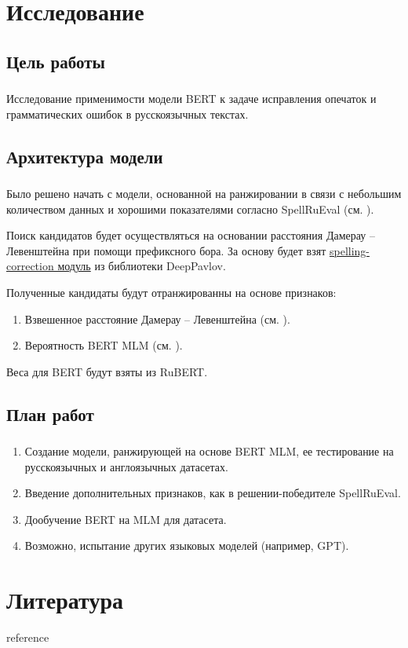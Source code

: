 \documentclass[t]{beamer}  %
\begin{document}
\section{Исследование}
\subsection{Цель работы}
\begin{frame}
	\frametitle{\insertsection} 
	\framesubtitle{\insertsubsection}
	Исследование применимости модели BERT к задаче исправления опечаток и грамматических ошибок в русскоязычных текстах.
\end{frame}

\subsection{Архитектура модели}
\begin{frame}
	\frametitle{\insertsection} 
	\framesubtitle{\insertsubsection}
	
	Было решено начать с модели, основанной на ранжировании в связи с небольшим количеством данных и хорошими показателями согласно SpellRuEval (см.  \textcite{Sorokin2016}).
	
	Поиск кандидатов будет осуществляться на основании расстояния Дамерау -- Левенштейна при помощи префиксного бора. За основу будет взят \href{https://github.com/deepmipt/DeepPavlov/tree/0.12.1/deeppavlov/models/spelling_correction}{spelling-correction модуль} из библиотеки DeepPavlov.
	
	Полученные кандидаты будут отранжированны на основе признаков:
	\begin{enumerate}
		\item Взвешенное расстояние Дамерау -- Левенштейна (см. \textcite{Brill2000}).
		\item Вероятность BERT MLM (см. \textcite{Devlin2019}).
	\end{enumerate}

	Веса для BERT будут взяты из RuBERT.
	
\end{frame}

\subsection{План работ}
\begin{frame}
	\frametitle{\insertsection} 
	\framesubtitle{\insertsubsection}
	\begin{enumerate}
		\item Создание модели, ранжирующей на основе BERT MLM, ее тестирование на русскоязычных и англоязычных датасетах.
		\item Введение дополнительных признаков, как в решении-победителе SpellRuEval.
		\item Дообучение BERT на MLM для датасета.
		\item Возможно, испытание других языковых моделей (например, GPT).
	\end{enumerate}
\end{frame}

\section{Литература}
\begin{frame}[allowframebreaks]{reference}
	\frametitle{\insertsection} 
	\printbibliography
\end{frame}
\end{document}
